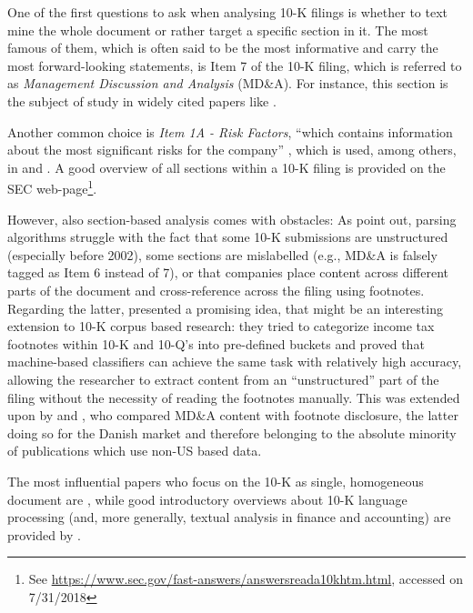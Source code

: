 One of the first questions to ask when analysing 10-K filings is whether to text mine the whole document or rather target a specific section in it. The most famous of them, which is often said to be the most informative and carry the most forward-looking statements, is Item 7 of the 10-K filing, which is referred to as \textit{Management Discussion and Analysis} (MD\&A). For instance, this section is the subject of study in widely cited papers like \textcite{Kogan2009_1, Li2010, Feldman_et_al_2010, TsaiWang2012, WangTsaiLiuChang2013, TsaiWang2013, TsaiWangChien2016, TsaiWang2016}. 

Another common choice is \textit{Item 1A - Risk Factors}, \enquote{which contains information about the most significant risks for the company} \parencite[1712]{Rekabsaz2017}, which is used, among others, in \textcite{HuangLi2011} and \textcite{Rekabsaz2017}. A good overview of all sections within a 10-K filing is provided on the SEC web-page\footnote{See \url{https://www.sec.gov/fast-answers/answersreada10khtm.html}, accessed on 7/31/2018}.  

However, also section-based analysis comes with obstacles: As \textcite{LM-meta-2016} point out, parsing algorithms struggle with the fact that some 10-K submissions are unstructured (especially before 2002), some sections are mislabelled (e.g., MD\&A is falsely tagged as Item 6 instead of 7), or that companies place content across different parts of the document and cross-reference across the filing using footnotes. Regarding the latter, \textcite{HeidariFelden_Footnotes_2015} presented a promising idea, that might be an interesting extension to 10-K corpus based research: they tried to categorize income tax footnotes within 10-K and 10-Q's into pre-defined buckets and proved that machine-based classifiers can achieve the same task with relatively high accuracy, allowing the researcher to extract content from an \enquote{unstructured} part of the filing without the necessity of reading the footnotes manually. This was extended upon by \textcite{Amel-Zadeh_Faasse_2016} and \textcite{ThinggaardJeppersenMadsen2016}, who compared MD\&A content with footnote disclosure, the latter doing so for the Danish market and therefore belonging to the absolute minority of publications which use non-US based data.

The most influential papers who focus on the 10-K as single, homogeneous document are \textcite{KothariLiShort_2009, LehavyLiMerkley2011, Loughran2011, Loughran2014, LM-meta-2016}, while good introductory overviews about 10-K language processing (and, more generally, textual analysis in finance and accounting) are provided by \textcite{Qiu07, Pulliza2015, LM-meta-2016}. 

